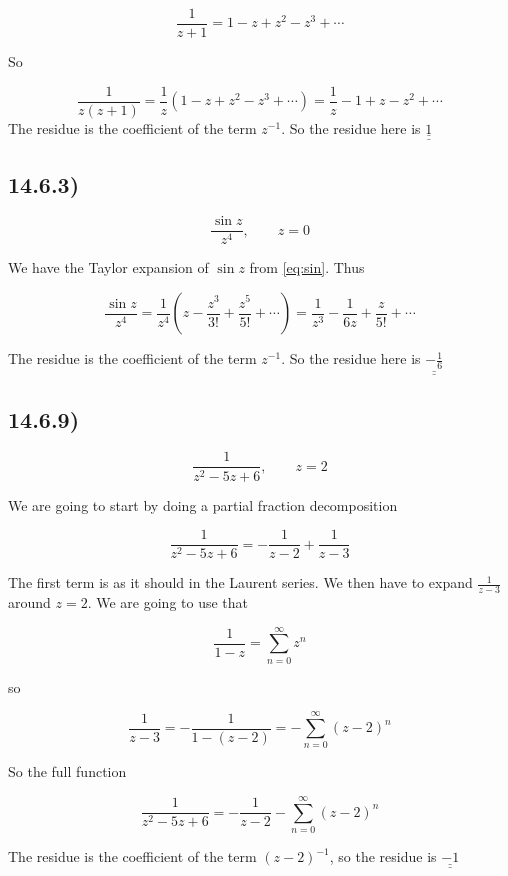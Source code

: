\documentclass[a4paper,norsk, 10pt]{article}
\begin{document}
$$
\frac{1}{z+1} = 1-z+z^2-z^3 + \cdots
$$

So

$$
\frac{1}{z(z+1)} = \frac{1}{z}\left(1-z+z^2-z^3 + \cdots\right) = \frac{1}{z} - 1 +z -z^2 +\cdots
$$
The residue is the coefficient of the term $z^{-1}$. So the residue here is $\underline{\underline{1}}$



\subsection*{14.6.3)}
$$
\frac{\sin z}{z^4}, \qquad z = 0
$$

We have the Taylor expansion of $\sin z$ from \ref{eq:sin}. Thus

$$
\frac{\sin z}{z^4} = \frac{1}{z^4}\left(z - \frac{z^3}{3!} + \frac{z^5}{5!} + \cdots\right) = \frac{1}{z^3} - \frac{1}{6z} + \frac{z}{5!} + \cdots
$$

The residue is the coefficient of the term $z^{-1}$. So the residue here is $\underline{\underline{-\frac{1}{6}}}$

\subsection*{14.6.9)}
$$
\frac{1}{z^2 - 5z +6}, \qquad	 z=2
$$

We are going to start by doing a partial fraction decomposition

$$
\frac{1}{z^2 - 5z +6} = -\frac{1}{z-2} + \frac{1}{z-3}
$$

The first term is as it should in the Laurent series. We then have to expand $\frac{1}{z-3}$ around $z = 2$. We are going to use that

$$
\frac{1}{1-z} = \sum_{n = 0}^{\infty}z^n
$$

so

$$
\frac{1}{z-3} = -\frac{1}{1-(z-2)} = -\sum_{n = 0}^{\infty}(z-2)^n
$$

So the full function

$$
\frac{1}{z^2 - 5z +6} = -\frac{1}{z-2} -\sum_{n = 0}^{\infty}(z-2)^n
$$

The residue is the coefficient of the term $(z-2)^{-1}$, so the residue is $\underline{\underline{-1}}$
\end{document}
